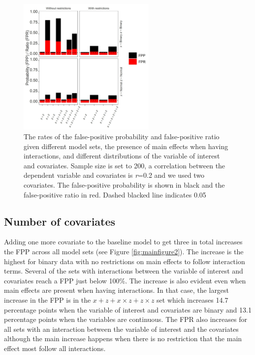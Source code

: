 \begin{figure}[hbt!]
\includegraphics[width=0.6\textwidth]{R/Analysis/Result/Figures/Figure1A.jpeg}
\centering
\caption{The rates of the false-positive probability and false-positive ratio given different model sets, the presence of main effects when having interactions, and different distributions of the variable of interest and covariates. Sample size is set to 200, a correlation between the dependent variable and covariates is \textit{r}=0.2 and we used two covariates. The false-positive probability is shown in black and the false-positive ratio in red. Dashed blacked line indicates 0.05}
\label{fig:mainfigure1}
\end{figure}

\subsection{Number of covariates}
Adding one more covariate to the baseline model to get three in total increases the FPP across all model sets (see Figure \ref{fig:mainfigure2}). The increase is the highest for binary data with no restrictions on main effects to follow interaction terms. Several of the sets with interactions between the variable of interest and covariates reach a FPP just below 100\%. The increase is also evident even when main effects are present when having interactions. In that case, the largest increase in the FPP is in the $x + z+ x \times z + z \times z$ set which increases 14.7 percentage points when the variable of interest and covariates are binary and 13.1 percentage points when the variables are continuous. The FPR also increases for all sets with an interaction between the variable of interest and the covariates although the main increase happens when there is no restriction that the main effect most follow all interactions. 

